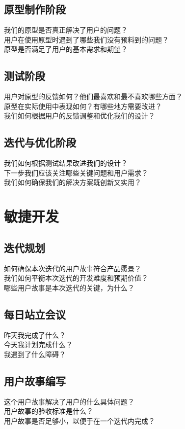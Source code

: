 \documentclass[12pt]{book}
\begin{document}
\subsection{原型制作阶段}
我们的原型是否真正解决了用户的问题？\\
用户在使用原型时遇到了哪些我们没有预料到的问题？\\
原型是否满足了用户的基本需求和期望？\\
\subsection{测试阶段}
用户对原型的反馈如何？他们最喜欢和最不喜欢哪些方面？\\
原型在实际使用中表现如何？有哪些地方需要改进？\\
我们如何根据用户的反馈调整和优化我们的设计？\\
\subsection{迭代与优化阶段}
我们如何根据测试结果改进我们的设计？\\
下一步我们应该关注哪些关键问题和用户需求？\\
我们如何确保我们的解决方案既创新又实用？\\


\section{敏捷开发}
\subsection{迭代规划}
如何确保本次迭代的用户故事符合产品愿景？\\
我们如何平衡本次迭代的开发难度和预期价值？\\
哪些用户故事是本次迭代的关键，为什么？\\

\subsection{每日站立会议}
昨天我完成了什么？\\
今天我计划完成什么？\\
我遇到了什么障碍？\\

\subsection{用户故事编写}
这个用户故事解决了用户的什么具体问题？\\
用户故事的验收标准是什么？\\
用户故事是否足够小，以便于在一个迭代内完成？\\
\end{document}
